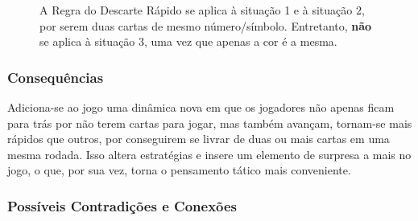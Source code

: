 \begin{figure}[!h]
\centering
{}
\caption{A Regra do Descarte Rápido se aplica à situação 1 e à situação 2, por serem duas cartas de mesmo número/símbolo. Entretanto, \textbf{não} se aplica à situação 3, uma vez que apenas a cor é a mesma.}
\end{figure}

\subsubsection{Consequências}

Adiciona-se ao jogo uma dinâmica nova em que os jogadores não apenas ficam para trás por não terem cartas para jogar, mas também avançam, tornam-se mais rápidos que outros, por conseguirem se livrar de duas ou mais cartas em uma mesma rodada. Isso altera estratégias e insere um elemento de surpresa a mais no jogo, o que, por sua vez, torna o pensamento tático mais conveniente. 

\subsubsection{Possíveis Contradições e Conexões}

